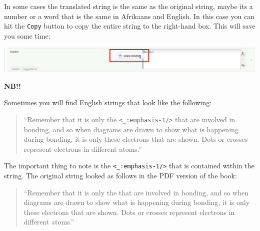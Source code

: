 \documentclass[12pt, a4paper]{article}
\begin{document}
In some cases the translated string is the same as the original string, maybe its a number or a word that is the same in Afrikaans and English. In this case you can hit the \texttt{Copy} button to copy the entire string to the right-hand box. This will save you some time:
\begin{center}
    \centerline{\includegraphics[width=0.8\paperwidth]{images/copy_source.png}}
\end{center}



\textbf{NB!!}

Sometimes you will find English strings that look like the following:

\begin{quotation}
``Remember that it is only the \verb|<_:emphasis-1/>| that are involved in bonding, 
and so when diagrams are drawn to show what is happening during bonding, 
it is only these electrons that are shown. Dots or crosses represent electrons 
in different atoms.''
\end{quotation}


The important thing to note is the \verb|<_:emphasis-1/>| that is contained within the string. The original string looked as follows in the PDF version of the book:

\begin{quotation}
``Remember that it is only the  that are involved in bonding, 
and so when diagrams are drawn to show what is happening during bonding, 
it is only these electrons that are shown. Dots or crosses represent electrons 
in different atoms.''
\end{quotation}
\end{document}
